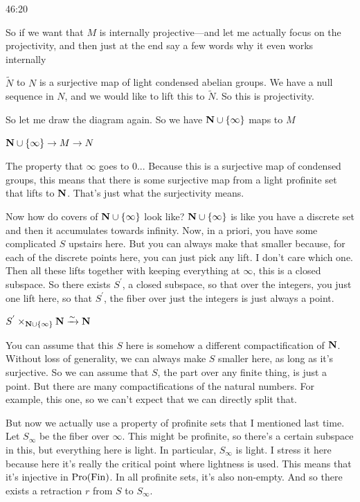 \begin{unfinished}{46:20}
\begin{desiderata}
So if we want that $M$ is internally projective---and let me actually focus on the projectivity, and then just at the end say a few words why it even works internally


$\widetilde{N}$ to $N$ is a surjective map of light condensed abelian groups.
We have a null sequence in $N$, and we would like to lift this to $\widetilde{N}$.
So this is projectivity.

\end{desiderata}

So let me draw the diagram again. So we have $\mathbf N \cup \{\infty\}$ maps to $M$

$\mathbf N \cup \{\infty\} \to M \to N $  

The property that $\infty$ goes to $0$... 
Because this is a surjective map of condensed groups, this means that there is some surjective map from a light profinite set that lifts to $\mathbf N$. That's just what the surjectivity means.

Now how do covers of $\mathbf N \cup \{\infty\}$ look like? $\mathbf N \cup \{\infty\}$ is like you have a discrete set and then it accumulates towards infinity. Now, in a priori, you have some complicated $S$ upstairs here. 
But you can always make that smaller because, for each of the discrete points here, you can just pick any lift. I don't care which one. Then all these lifts together with keeping everything at $\infty$, this is a closed subspace. So there exists $S^{'}$, a closed subspace, so that over the integers, 
you just one lift here, so that $S^{'}$, the fiber over just the integers is just always a point.

$S^{'} \times_{\mathbf N \cup \{\infty\}} \mathbf N \xrightarrow{\sim} \mathbf N $

You can assume that this $S$ here is somehow a different compactification of $\mathbf N$. Without loss of generality, we can always make $S$ smaller here, as long as it's surjective. So we can assume that $S$, the part over any finite thing, is just a point. But there are many compactifications of the natural numbers. For example, this one, so we can't expect that we can directly split that.

But now we actually use a property of profinite sets that I mentioned last time. Let $S_\infty$ be the fiber over $\infty$. This might be profinite, so there's a certain subspace in this, but everything here is light. In particular, $S_\infty$ is light. 
I stress it here because here it's really the critical point where lightness is used. This means that it's injective in $\operatorname{Pro}(\operatorname{Fin})$. In all profinite sets, it's also non-empty. And so there exists a retraction $r$ from $S$ to $S_\infty$.


\end{unfinished}
